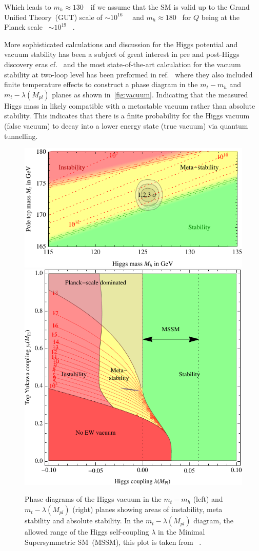 Which leads to $ m_h \approx 130$\ \GeV \ if we assume that the SM is valid up to the Grand Unified Theory~(GUT) scale of $ \sim 10^{16}$ \ \GeV \ and $ m_h \approx 180$ \GeV \ for $Q$ being at the Planck scale ~$ \sim 10^{19}$ \ \GeV  . 
\par More sophisticated calculations and discussion for the Higgs potential and vacuum stability has been a subject of great interest in pre and post-Higgs discovery eras cf.~\cite{Lindner:1985uk,Sher:1988mj,Casas:1996aq,Isidori:2001bm} and the most state-of-the-art calculation for the vacuum stability at two-loop level has been preformed in ref.~\cite{Degrassi:2012ry} where they also included finite temperature effects to construct a phase diagram in the $m_t-m_h$  and $m_t-\lambda(M_{pl})$ planes as shown in~\autoref{fig:vacuum}.  
Indicating that the measured Higgs mass in likely compatible with a metastable vacuum rather than absolute stability. This indicates that there is a finite probability for the Higgs vacuum  (false vacuum) to decay into a lower energy state (true vacuum) via quantum tunnelling.
\begin{figure}[t!]
	\begin{center}
		\includegraphics[height=0.32\textwidth]{figures/deadoraliveG2012}
		\includegraphics[height=0.32\textwidth]{figures/Ath}
		\caption{Phase diagrams of the Higgs vacuum in the $m_t-m_h$ (left) and  $m_t-\lambda(M_{pl})$ (right) planes showing areas of instability, meta stability and absolute stability. In the  $m_t-\lambda(M_{pl})$ diagram, the allowed range of the Higgs self-coupling $\lambda$ in the Minimal Supersymmetric SM~(MSSM), this plot is taken from ~\cite{Degrassi:2012ry}. }
		\label{fig:vacuum}
	\end{center}
\end{figure}
